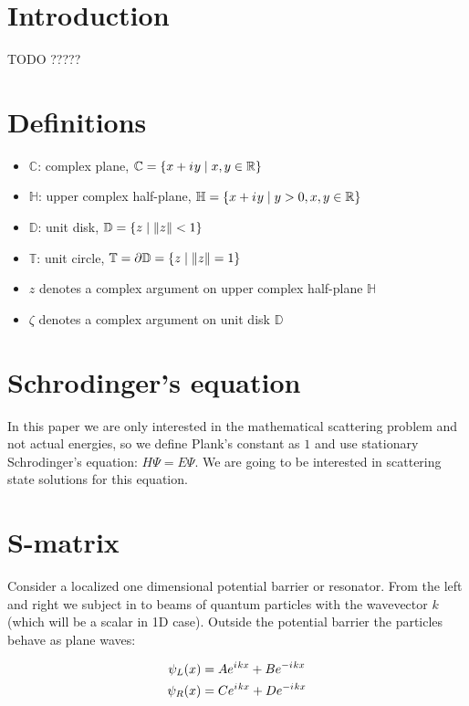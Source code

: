 \documentclass[12pt, a4paper]{article}
\theoremstyle{plain}
\newcommand{\bbC}{\mathbb{C}} %
\newcommand{\bbD}{\mathbb{D}} %
\newcommand{\bbR}{\mathbb{R}}
\newcommand{\bbT}{\mathbb{T}} %
\newcommand{\bbH}{\mathbb{H}}
\newcommand{\iu}{{i\mkern1mu}}
\newcommand{\eexp}[1]{e^{#1}}
\DeclarePairedDelimiter\abs{\lvert}{\rvert}%
\begin{document}
\section{Introduction}
TODO ?????

\section{Definitions}
\begin{itemize}
\item $\bbC$: complex plane, $\bbC = \{ x + \iu y \mid x, y \in \bbR \}$ 
\item $\bbH$: upper complex half-plane, $\bbH = \{ x + \iu y \mid y > 0, x, y \in \bbR \}$
\item $\bbD$: unit disk, $\bbD = \{ z \mid \abs{z} < 1 \}$
\item $\bbT$: unit circle, $\bbT = \partial \bbD =  \{z \mid \abs{z} = 1 \}$
\item $z$ denotes a complex argument on upper complex half-plane $\bbH$
\item $\zeta$ denotes a complex argument on unit disk $\bbD$
\end{itemize}

\section{Schrodinger's equation}
In this paper we are only interested in the mathematical scattering problem and not actual energies, so we define Plank's constant as $1$ and use stationary Schrodinger's equation: $H \Psi = E \Psi$. We are going to be interested in scattering state solutions for this equation.

\section{S-matrix}\label{sec:smatrix}
Consider a localized one dimensional potential barrier or resonator. From the left and right we subject in to beams of quantum particles with the wavevector $k$ (which will be a scalar in 1D case). Outside the potential barrier the particles behave as plane waves:

\begin{equation}\label{eq:wlwl}
\begin{aligned}
   \psi_L(x) &= A \eexp{\iu k x} + B \eexp{-\iu k x}
\\ \psi_R(x) &= C \eexp{\iu k x} + D \eexp{-\iu k x}
\end{aligned}
\end{equation}
\end{document}
